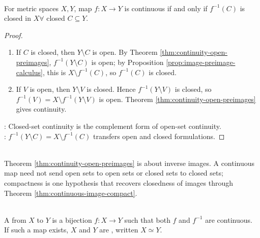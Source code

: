 \begin{corollary} \label{cor:continuity-closed-preimages} \\
For metric spaces $X,Y$, map $f:X\to Y$ is continuous if and only if $f^{-1}(C)$ is closed in $X \forall$ closed $C\subseteq Y$.
\begin{proof}
\begin{enumerate}[label=\roman*.]
\setlength{\itemsep}{0pt}
\item[$(\Rightarrow)$] If $C$ is closed, then $Y\setminus C$ is open. By Theorem \ref{thm:continuity-open-preimages}, $f^{-1}(Y\setminus C)$ is open; by Proposition \ref{prop:image-preimage-calculus}, this is $X\setminus f^{-1}(C)$, so $f^{-1}(C)$ is closed.
\item[$(\Leftarrow)$] If $V$ is open, then $Y\setminus V$ is closed. Hence $f^{-1}(Y\setminus V)$ is closed, so $f^{-1}(V)=X\setminus f^{-1}(Y\setminus V)$ is open. Theorem \ref{thm:continuity-open-preimages} gives continuity.
\end{enumerate}
: Closed-set continuity is the complement form of open-set continuity.\\
: $f^{-1}(Y\setminus C)=X\setminus f^{-1}(C)$ transfers open and closed formulations.
\end{proof}
\end{corollary}

\begin{remark} \label{rem:continuity-controls-preimages-not-images} \\
Theorem \ref{thm:continuity-open-preimages} is about inverse images. A continuous map need not send open sets to open sets or closed sets to closed sets; compactness is one hypothesis that recovers closedness of images through Theorem \ref{thm:continuous-image-compact}.
\end{remark}

\begin{definition} \label{def:homeomorphism} \\
A  from $X$ to $Y$ is a bijection $f:X\to Y$ such that both $f$ and $f^{-1}$ are continuous.\\
If such a map exists, $X$ and $Y$ are , written $X\simeq Y$.
\end{definition}

